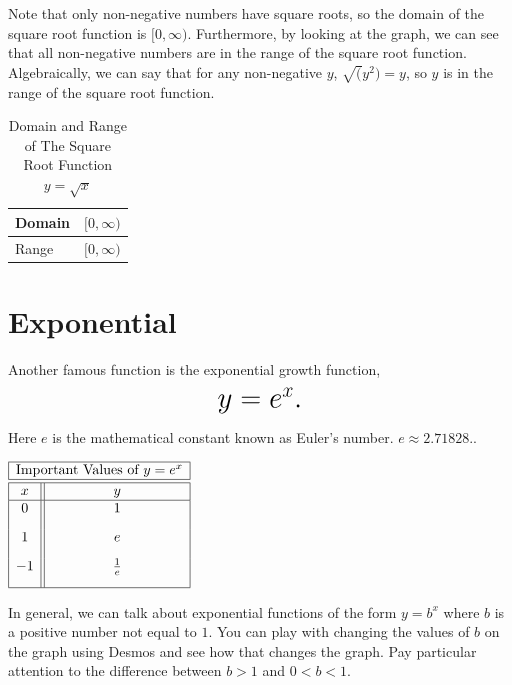 \documentclass[nooutcomes]{ximera}
\begin{document}
Note that only non-negative numbers have square roots, so the domain of the square root function is $[0, \infty)$. Furthermore, by looking at the graph, we can see that all non-negative numbers are in the range of the square root function. Algebraically, we can say that for any non-negative $y$, $\sqrt(y^2) = y$, so $y$ is in the range of the square root function. 


\begin{table}[h]
\caption{\label{tab:sqrtdr}Domain and Range of The Square Root Function $y = \sqrt{x}$}
\centering
\begin{tabular}{l|l}
Domain & $[0, \infty)$ \\ \hline
Range & $[0, \infty)$
\end{tabular}
\end{table}
\newpage


\section{Exponential}
Another famous function is the exponential growth function, $$ \mbox{\huge $y=e^{x}.$}$$ 

Here $e$ is the mathematical constant known as Euler's number.  $e \approx 2.71828 .$.

\begin{image}
\end{image}

\begin{center}
\(
\begin{array}{ |c || c|  }
 \hline
 \multicolumn{2}{|c|}{\text{\normalfont Important Values of } y=e^x} \\
\hline
 \hline
 x & y\\
 \hline
 0&1\\[2ex]
 1&e\\[2ex]
 -1&\frac{1}{e}\\[2ex]
 \hline
\end{array}
\)
\end{center}

In general, we can talk about exponential functions of the form $y=b^{x}$ where $b$ is a positive number not equal to $1$.  You can play with changing the values of $b$ on the graph using Desmos and see how that changes the graph.  Pay particular attention to the difference between $b>1$ and $0<b<1$.
\end{document}
